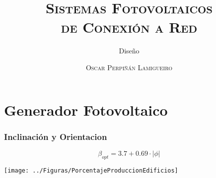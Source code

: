 \documentclass[serif, xcolor=dvipsnames]{beamer}
\begin{document}
\title[\textsc{SFCR: Diseño}]{\textsc{Sistemas Fotovoltaicos }\\
  \textsc{de Conexión a Red}}

\subtitle{Diseño}


\author{\textsc{Oscar Perpiñán Lamigueiro}} \date{}

\frame[plain]{\titlepage}


%

\section{Generador Fotovoltaico}


\begin{frame}[plain]
  \frametitle{Inclinación y Orientacion}

\[
\beta_{opt}=3.7+0.69 \cdot \left|\phi\right|\]


\begin{center}
  \texttt{[image: ../Figuras/PorcentajeProduccionEdificios]}
  \par\end{center}


\end{frame}
\end{document}
